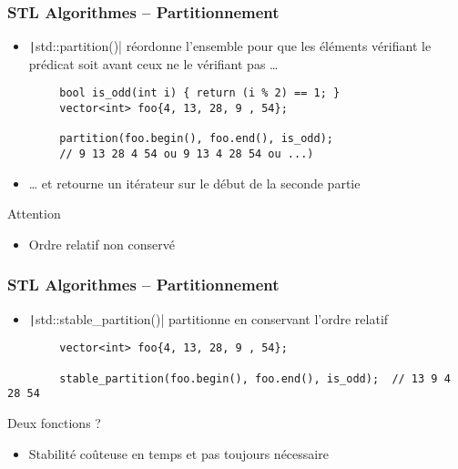 \documentclass[C++.tex]{subfiles}
\begin{document}
\begin{frame}[fragile]
	\frametitle{STL Algorithmes -- Partitionnement}
	\begin{itemize}
		\item \texttt|std::partition()| réordonne l'ensemble pour que les éléments vérifiant le prédicat soit avant ceux ne le vérifiant pas \ldots{}
	\end{itemize}

	\begin{verbatim}
		bool is_odd(int i) { return (i % 2) == 1; }
		vector<int> foo{4, 13, 28, 9 , 54};

		partition(foo.begin(), foo.end(), is_odd);
		// 9 13 28 4 54 ou 9 13 4 28 54 ou ...)
	\end{verbatim}

	\begin{itemize}
		\item \ldots{} et retourne un itérateur sur le début de la seconde partie
	\end{itemize}

	\begin{alertblock}{Attention}
		\begin{itemize}
			\item Ordre relatif non conservé
		\end{itemize}
	\end{alertblock}
\end{frame}

\begin{frame}[fragile]
	\frametitle{STL Algorithmes -- Partitionnement}
	\begin{itemize}
		\item \texttt|std::stable_partition()| partitionne en conservant l'ordre relatif
	\end{itemize}

	\begin{verbatim}
		vector<int> foo{4, 13, 28, 9 , 54};

		stable_partition(foo.begin(), foo.end(), is_odd);  // 13 9 4 28 54
	\end{verbatim}

	\begin{block}{Deux fonctions ?}
		\begin{itemize}
			\item Stabilité coûteuse en temps et pas toujours nécessaire
		\end{itemize}
	\end{block}
\end{frame}
\end{document}
